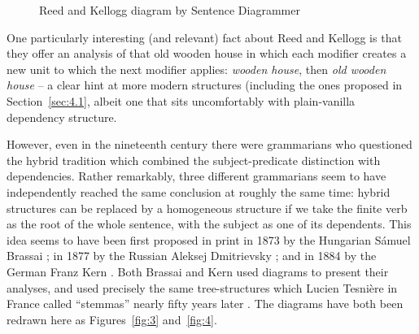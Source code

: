 \documentclass[output=paper]{langscibook}
\begin{document}
 \begin{figure}
 	\centering
{}
	\caption{Reed and Kellogg diagram by Sentence Diagrammer}
	\label{fig:2}
 \end{figure}
 
One particularly interesting (and relevant) fact about Reed and Kellogg is that they offer an analysis of that old wooden house in which each modifier creates a new unit to which the next modifier applies: \emph{wooden house}, then \emph{old wooden house} \citep[18]{Percival1976} – a clear hint at more modern structures (including the ones proposed in Section~\ref{sec:4.1}, albeit one that sits uncomfortably with plain-vanilla dependency structure.
 
However, even in the nineteenth century there were grammarians who questioned the hybrid tradition which combined the subject-predicate distinction with dependencies. Rather remarkably, three different grammarians seem to have independently reached the same conclusion at roughly the same time: hybrid structures can be replaced by a homogeneous structure if we take the finite verb as the root of the whole sentence, with the subject as one of its dependents. This idea seems to have been first proposed in print in 1873 by the Hungarian Sámuel Brassai \citep{Imrenyi2013a,ImrenyiVladarTBA}; in 1877 by the Russian Aleksej Dmitrievsky \citep{Seriot2004}; and in 1884 by the German Franz Kern \citep{Kern1884a-u}. Both Brassai and Kern used diagrams to present their analyses, and used precisely the same tree-structures which Lucien Tesnière in France called ``stemmas'' nearly fifty years later \citep{Tesniere59a-u,Tesniere2015a-u}. The diagrams have both been redrawn here as Figures~\ref{fig:3} and~\ref{fig:4}.
\end{document}
